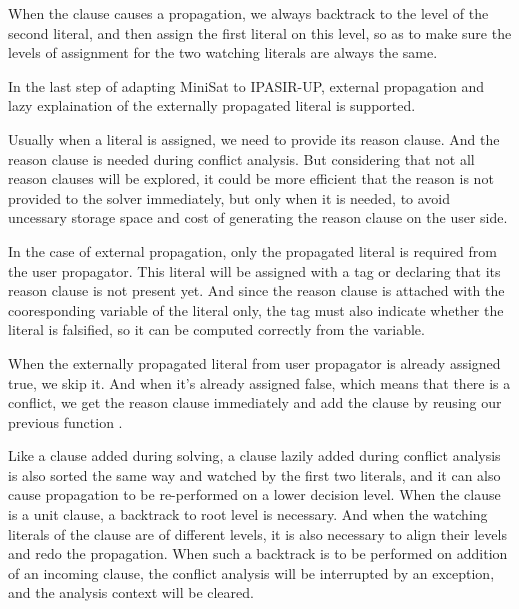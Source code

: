 When the clause causes a propagation, we always backtrack to the level of the second literal, and then assign the first literal on this level, so as to make sure the levels of assignment for the two watching literals are always the same.



In the last step of adapting MiniSat to IPASIR-UP, external propagation and lazy explaination of the externally propagated literal is supported.

Usually when a literal is assigned, we need to provide its reason clause. And the reason clause is needed during conflict analysis. But considering that not all reason clauses will be explored, it could be more efficient that the reason is not provided to the solver immediately, but only when it is needed, to avoid uncessary storage space and cost of generating the reason clause on the user side.

In the case of external propagation, only the propagated literal is required from the user propagator. This literal will be assigned with a tag  or  declaring that its reason clause is not present yet. And since the reason clause is attached with the cooresponding variable of the literal only, the tag must also indicate whether the literal is falsified, so it can be computed correctly from the variable.

When the externally propagated literal from user propagator is already assigned true, we skip it. And when it's already assigned false, which means that there is a conflict, we get the reason clause immediately and add the clause by reusing our previous function .

Like a clause added during solving, a clause lazily added during conflict analysis is also sorted the same way and watched by the first two literals, and it can also cause propagation to be re-performed on a lower decision level. When the clause is a unit clause, a backtrack to root level is necessary. And when the watching literals of the clause are of different levels, it is also necessary to align their levels and redo the propagation. When such a backtrack is to be performed on addition of an incoming clause, the conflict analysis will be interrupted by an exception, and the analysis context will be cleared.

